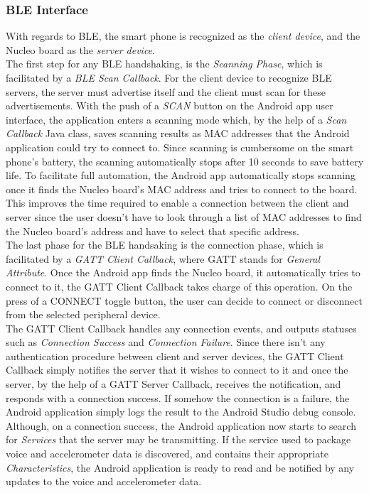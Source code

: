 \subsubsection{BLE Interface}

With regards to BLE, the smart phone is recognized as the \textit{client device}, and the Nucleo board as the \textit{server device}.\\ 

The first step for any BLE handshaking, is the \textit{Scanning Phase}, which is facilitated by a \textit{BLE Scan Callback}. For the client device to recognize BLE servers, the server must advertise itself and the client must scan for these advertisements. With the push of a \textit{SCAN} button on the Android app user interface, the application enters a scanning mode which, by the help of a \textit{Scan Callback} Java class, saves scanning results as MAC addresses that the Android application could try to connect to. Since scanning is cumbersome on the smart phone's battery, the scanning automatically stops after 10 seconds to save battery life. To facilitate full automation, the Android app automatically stops scanning once it finds the Nucleo board's MAC address and tries to connect to the board. This improves the time required to enable a connection between the client and server since the user doesn't have to look through a list of MAC addresses to find the Nucleo board's address and have to select that specific address.\\

The last phase for the BLE handsaking is the connection phase, which is facilitated by a \textit{GATT Client Callback}, where GATT stands for \textit{General Attribute}. Once the Android app finds the Nucleo board, it automatically tries to connect to it, the GATT Client Callback takes charge of this operation. On the press of a CONNECT toggle button, the user can decide to connect or disconnect from the selected peripheral device.\\

The GATT Client Callback handles any connection events, and outputs statuses such as \textit{Connection Success} and \textit{Connection Failure}. Since there isn't any authentication procedure between client and server devices, the GATT Client Callback simply notifies the server that it wishes to connect to it and once the server, by the help of a GATT Server Callback, receives the notification, and responds with a connection success. If somehow the connection is a failure, the Android application simply logs the result to the Android Studio debug console. Although, on a connection success, the Android application now starts to search for \textit{Services} that the server may be transmitting. If the service used to package voice and accelerometer data is discovered, and contains their appropriate \textit{Characteristics}, the Android application is ready to read and be notified by any updates to the voice and accelerometer data.\\

